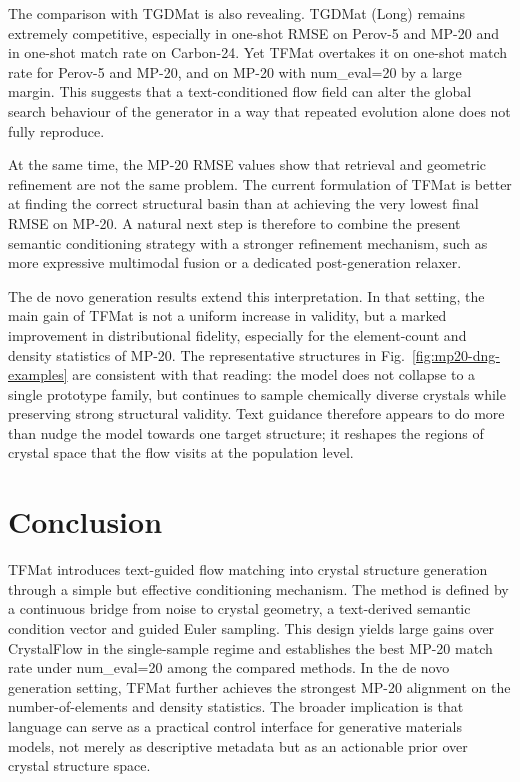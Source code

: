 \documentclass[fleqn,10pt]{wlscirep}
\begin{document}
The comparison with TGDMat is also revealing. TGDMat (Long) remains extremely competitive, especially in one-shot RMSE on Perov-5 and MP-20 and in one-shot match rate on Carbon-24. Yet TFMat overtakes it on one-shot match rate for Perov-5 and MP-20, and on MP-20 with num\_eval=20 by a large margin. This suggests that a text-conditioned flow field can alter the global search behaviour of the generator in a way that repeated evolution alone does not fully reproduce.

At the same time, the MP-20 RMSE values show that retrieval and geometric refinement are not the same problem. The current formulation of TFMat is better at finding the correct structural basin than at achieving the very lowest final RMSE on MP-20. A natural next step is therefore to combine the present semantic conditioning strategy with a stronger refinement mechanism, such as more expressive multimodal fusion or a dedicated post-generation relaxer.

The de novo generation results extend this interpretation. In that setting, the main gain of TFMat is not a uniform increase in validity, but a marked improvement in distributional fidelity, especially for the element-count and density statistics of MP-20. The representative structures in Fig.~\ref{fig:mp20-dng-examples} are consistent with that reading: the model does not collapse to a single prototype family, but continues to sample chemically diverse crystals while preserving strong structural validity. Text guidance therefore appears to do more than nudge the model towards one target structure; it reshapes the regions of crystal space that the flow visits at the population level.

\section*{Conclusion}
TFMat introduces text-guided flow matching into crystal structure generation through a simple but effective conditioning mechanism. The method is defined by a continuous bridge from noise to crystal geometry, a text-derived semantic condition vector and guided Euler sampling. This design yields large gains over CrystalFlow in the single-sample regime and establishes the best MP-20 match rate under num\_eval=20 among the compared methods. In the de novo generation setting, TFMat further achieves the strongest MP-20 alignment on the number-of-elements and density statistics. The broader implication is that language can serve as a practical control interface for generative materials models, not merely as descriptive metadata but as an actionable prior over crystal structure space.
\end{document}
